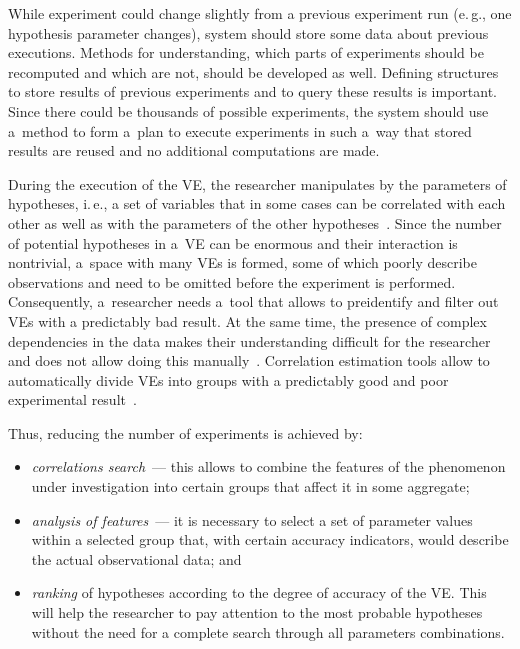 \begin{multicols}{2}
      While experiment could change slightly from a previous experiment run 
(e.\,g., one hypothesis parameter changes), system should store some data about 
previous executions. Methods for understanding, which parts of experiments should 
be recomputed and which are not, should be developed as well. Defining structures to 
store results of previous experiments and to query these results is important. Since there 
could be thousands of possible experiments, the system should use a~method to form 
a~plan to execute experiments in such a~way that stored results are reused and no 
additional computations are made. 
      
      During the execution of the VE, the researcher manipulates by 
the parameters of hypotheses, i.\,e., a set of variables that in some cases can be 
correlated with each other as well as with the parameters of the other 
hypotheses~\cite{2-tar, 12-tar}. Since the number of potential hypotheses in a~VE 
can be enormous and their interaction is nontrivial, a~space with many 
VEs is formed, some of which poorly describe observations and need 
to be omitted before the experiment is performed. Consequently, a~researcher needs 
a~tool that allows to preidentify and filter out VEs with a predictably 
bad result. At the same time, the presence of complex dependencies in the data makes 
their understanding difficult for the researcher and does not allow doing this 
manually~\cite{6-tar}. Correlation estimation tools allow to automatically divide 
VEs into groups with a predictably good and poor experimental 
result~\cite{13-tar}.
      
      Thus, reducing the number of experiments is achieved by:
      \begin{itemize}
\item \textit{correlations search}~--- this allows to combine the features of the 
phenomenon under investigation into certain groups that affect it in some 
aggregate;
\item \textit{analysis of features}~--- it is necessary to select a set of parameter 
values within a selected group that, with certain accuracy indicators, would 
describe the actual observational data; and
\item \textit{ranking} of hypotheses according to the degree of accuracy of the 
VE. This will help the researcher to pay attention to the most 
probable hypotheses without the need for a complete search through all 
parameters combinations.
\end{itemize}


\end{multicols}
